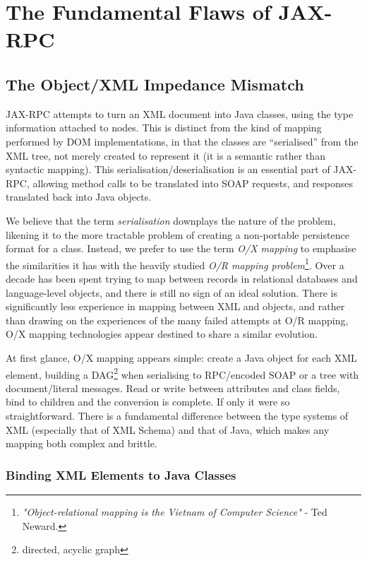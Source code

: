 \section{The Fundamental Flaws of JAX-RPC}
\label{objections}

\subsection{The Object/XML Impedance Mismatch}
\label{objections:o-x}

JAX-RPC attempts to turn an XML document into Java classes, using the
type information attached to nodes. This is distinct from the kind of
mapping performed by DOM implementations, in that the classes are
``serialised'' from the XML tree, not merely created to represent it
(it is a semantic rather than syntactic mapping). This
serialisation/deserialisation is an essential part of JAX-RPC,
allowing method calls to be translated into SOAP requests, and
responses translated back into Java objects.

We believe that the term \emph{serialisation} downplays the nature of
the problem, likening it to the more tractable problem of creating a
non-portable persistence format for a class. Instead, we prefer to use
the term \emph{O/X mapping} to emphasise the similarities it has with
the heavily studied \emph{O/R mapping problem}\footnote{
\emph{"Object-relational mapping is the Vietnam of Computer Science"}
- Ted Neward.
}. 
Over a decade has been spent trying to map between records in relational
databases and language-level objects, and there is still no sign of an ideal
solution. There is significantly less experience in mapping between XML and
objects, and rather than drawing on the experiences of the many failed attempts
at O/R mapping, O/X mapping technologies appear destined to share a similar
evolution.

At first glance, O/X mapping appears simple: create a Java object for
each XML element, building a DAG\footnote{directed, acyclic graph}
when serialising to RPC/encoded SOAP or a tree with document/literal
messages. Read or write between attributes and class fields, bind to
children and the conversion is complete. If only it were so
straightforward. There is a fundamental difference between the type
systems of XML (especially that of XML Schema) and that of Java, which
makes any mapping both complex and brittle.

\subsubsection{Binding XML Elements to Java Classes}
\label{objections:o-x:xml-classes}

